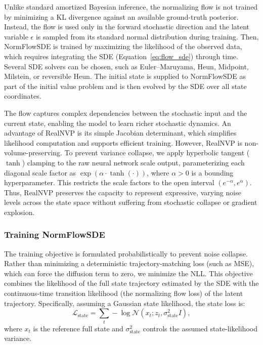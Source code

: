 Unlike standard amortized Bayesian inference, the normalizing flow is not trained by minimizing a KL divergence against an available ground-truth posterior. Instead, the flow is used only in the forward stochastic direction and the latent variable $\epsilon$ is sampled from its standard normal distribution during training. Then, NormFlowSDE is trained by maximizing the likelihood of the observed data, which requires integrating the SDE (Equation~\ref{eq:flow_sde}) through time. Several SDE solvers can be chosen, such as Euler--Maruyama, Heun, Midpoint, Milstein, or reversible Heun. The initial state is supplied to NormFlowSDE as part of the initial value problem and is then evolved by the SDE over all state coordinates.

The flow captures complex dependencies between the stochastic input and the current state, enabling the model to learn richer stochastic dynamics. An advantage of RealNVP is its simple Jacobian determinant, which simplifies likelihood computation and supports efficient training. However, RealNVP is non-volume-preserving. To prevent variance collapse, we apply hyperbolic tangent ($\tanh$) clamping to the raw neural network scale output, parameterizing each diagonal scale factor as $\exp(\alpha \cdot \tanh(\cdot))$, where $\alpha > 0$ is a bounding hyperparameter. This restricts the scale factors to the open interval $(e^{-\alpha}, e^{\alpha})$. Thus, RealNVP preserves the capacity to represent expressive, varying noise levels across the state space without suffering from stochastic collapse or gradient explosion.

\subsubsection{Training NormFlowSDE}
The training objective is formulated probabilistically to prevent noise collapse. Rather than minimizing a deterministic trajectory-matching loss (such as \ac{MSE}), which can force the diffusion term to zero, we minimize the \ac{NLL}. This objective combines the likelihood of the full state trajectory estimated by the SDE with the continuous-time transition likelihood (the normalizing flow loss) of the latent trajectory. Specifically, assuming a Gaussian state likelihood, the state loss is:
\begin{equation}
    \mathcal{L}_{\text{state}}
    =
    \sum_{t} -\log \mathcal{N}\left(x_t; z_t, \sigma_{\text{state}}^2 I\right),
\end{equation}
where $x_t$ is the reference full state and $\sigma_{\text{state}}^2$ controls the assumed state-likelihood variance.

